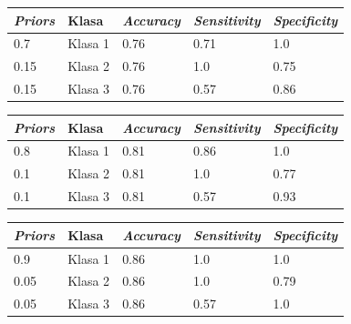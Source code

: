 \documentclass[12pt,a4paper]{article}
\begin{document}
\begin{table}[H]
\centering
\begin{tabular}{|l|l|l|l|l|}
\hline
\textbf{\textit{Priors}} 	& \textbf{Klasa}   	& \textbf{\textit{Accuracy}} 	& \textbf{\textit{Sensitivity}} 	& \textbf{\textit{Specificity}} 		\\ \hline
0.7             					& Klasa 1 			& 0.76              					& 0.71                 					& 1.0                  						\\ \hline
0.15            				& Klasa 2 			& 0.76              					& 1.0                  					& 0.75                 						\\ \hline
0.15            				& Klasa 3 			& 0.76              					& 0.57                 					& 0.86                 						\\ \hline
\end{tabular}
\end{table}

\begin{table}[H]
\centering
\begin{tabular}{|l|l|l|l|l|}
\hline
\textbf{\textit{Priors}} & \textbf{Klasa}   	& \textbf{\textit{Accuracy}} 	& \textbf{\textit{Sensitivity}} 	& \textbf{\textit{Specificity}} 		\\ \hline
0.8             				  & Klasa 1 				& 0.81              					& 0.86                 					& 1.0                  						\\ \hline
0.1             				  & Klasa 2 				& 0.81              					& 1.0                  					& 0.77                 						\\ \hline
0.1             				  & Klasa 3 				& 0.81              					& 0.57                 					& 0.93                 						\\ \hline
\end{tabular}
\end{table}

\begin{table}[H]
\centering
\begin{tabular}{|l|l|l|l|l|}
\hline
\textbf{\textit{Priors}} 	& \textbf{Klasa}   	& \textbf{\textit{Accuracy}} 	& \textbf{\textit{Sensitivity}} 	& \textbf{\textit{Specificity}} 		\\ \hline
0.9             					& Klasa 1 			& 0.86              					& 1.0                  					& 1.0                  						\\ \hline
0.05            				& Klasa 2 			& 0.86              					& 1.0                  					& 0.79                 						\\ \hline
0.05            				& Klasa 3 			& 0.86              					& 0.57                 					& 1.0                  						\\ \hline
\end{tabular}
\end{table}
\end{document}
